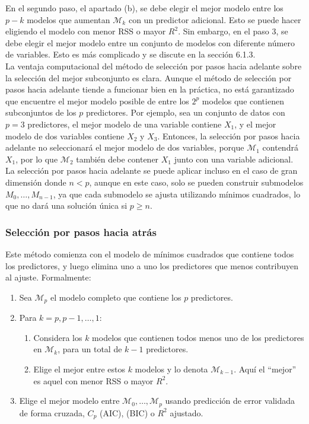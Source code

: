 En el segundo paso, el apartado (b), se debe elegir el mejor modelo entre los $p-k$ modelos que aumentan $\mathcal{M}_k$ con un predictor adicional. Esto se puede hacer eligiendo el modelo con menor RSS o mayor $R^2$. Sin embargo, en el paso 3, se debe elegir el mejor modelo entre un conjunto de modelos con diferente número de variables. Esto es más complicado y se discute en la sección 6.1.3. \\

La ventaja computacional del método de selección por pasos hacia adelante sobre la selección del mejor subconjunto es clara. Aunque el método de selección por pasos hacia adelante tiende a funcionar bien en la práctica, no está garantizado que encuentre el mejor modelo posible de entre los $2^p$ modelos que contienen subconjuntos de los $p$ predictores. Por ejemplo, sea un conjunto de datos con $p = 3$ predictores, el mejor modelo de una variable contiene $X_1$, y el mejor modelo de dos variables contiene $X_2$ y $X_3$. Entonces, la selección por pasos hacia adelante no seleccionará el mejor modelo de dos variables, porque $\mathcal{M}_1$ contendrá $X_1$, por lo que $\mathcal{M}_2$ también debe contener $X_1$ junto con una variable adicional. \\

La selección por pasos hacia adelante se puede aplicar incluso en el caso de gran dimensión donde $n < p$, aunque en este caso, solo se pueden construir submodelos $M_0, \dots, M_{n-1}$, ya que cada submodelo se ajusta utilizando mínimos cuadrados, lo que no dará una solución única si $p \geq n$.

\subsubsection{Selección por pasos hacia atrás}

Este método comienza con el modelo de mínimos cuadrados que contiene todos los predictores, y luego elimina uno a uno los predictores que menos contribuyen al ajuste. Formalmente:
\begin{enumerate}
\item Sea $\mathcal{M}_p$ el modelo completo que contiene los $p$ predictores.
\item Para $k = p, p-1, \dots, 1$:
\begin{enumerate}
\item Considera los $k$ modelos que contienen todos menos uno de los predictores en $\mathcal{M}_k$, para un total de $k-1$ predictores.
\item Elige el mejor entre estos $k$ modelos y lo denota $\mathcal{M}_{k-1}$. Aquí el ``mejor'' es aquel con menor RSS o mayor $R^2$.
\end{enumerate}
\item Elige el mejor modelo entre $\mathcal{M}_0, \dots, \mathcal{M}_p$ usando predicción de error validada de forma cruzada, $C_p$ (AIC), (BIC) o $R^2$ ajustado.
\end{enumerate}

